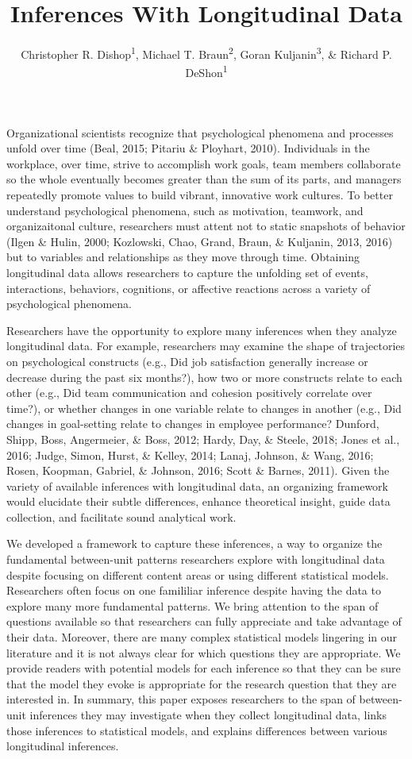 \documentclass[english,,man]{apa6}
\title{Inferences With Longitudinal Data}
\author{Christopher R. Dishop\textsuperscript{1}, Michael T.
Braun\textsuperscript{2}, Goran Kuljanin\textsuperscript{3}, \& Richard
P. DeShon\textsuperscript{1}}
\date{}
\affiliation{
\vspace{0.5cm}
\textsuperscript{1} Michigan State University\\\textsuperscript{2} University of South Florida\\\textsuperscript{3} DePaul University}
\theoremstyle{definition}
\theoremstyle{definition}
\theoremstyle{definition}
\theoremstyle{remark}
\begin{document}
\maketitle

Organizational scientists recognize that psychological phenomena and
processes unfold over time (Beal, 2015; Pitariu \& Ployhart, 2010).
Individuals in the workplace, over time, strive to accomplish work
goals, team members collaborate so the whole eventually becomes greater
than the sum of its parts, and managers repeatedly promote values to
build vibrant, innovative work cultures. To better understand
psychological phenomena, such as motivation, teamwork, and
organizaitonal culture, researchers must attent not to static snapshots
of behavior (Ilgen \& Hulin, 2000; Kozlowski, Chao, Grand, Braun, \&
Kuljanin, 2013, 2016) but to variables and relationships as they move
through time. Obtaining longitudinal data allows researchers to capture
the unfolding set of events, interactions, behaviors, cognitions, or
affective reactions across a variety of psychological phenomena.

Researchers have the opportunity to explore many inferences when they
analyze longitudinal data. For example, researchers may examine the
shape of trajectories on psychological constructs (e.g., Did job
satisfaction generally increase or decrease during the past six
months?), how two or more constructs relate to each other (e.g., Did
team communication and cohesion positively correlate over time?), or
whether changes in one variable relate to changes in another (e.g., Did
changes in goal-setting relate to changes in employee performance?
Dunford, Shipp, Boss, Angermeier, \& Boss, 2012; Hardy, Day, \& Steele,
2018; Jones et al., 2016; Judge, Simon, Hurst, \& Kelley, 2014; Lanaj,
Johnson, \& Wang, 2016; Rosen, Koopman, Gabriel, \& Johnson, 2016; Scott
\& Barnes, 2011). Given the variety of available inferences with
longitudinal data, an organizing framework would elucidate their subtle
differences, enhance theoretical insight, guide data collection, and
facilitate sound analytical work.

We developed a framework to capture these inferences, a way to organize
the fundamental between-unit patterns researchers explore with
longitudinal data despite focusing on different content areas or using
different statistical models. Researchers often focus on one famililiar
inference despite having the data to explore many more fundamental
patterns. We bring attention to the span of questions available so that
researchers can fully appreciate and take advantage of their data.
Moreover, there are many complex statistical models lingering in our
literature and it is not always clear for which questions they are
appropriate. We provide readers with potential models for each inference
so that they can be sure that the model they evoke is appropriate for
the research question that they are interested in. In summary, this
paper exposes researchers to the span of between-unit inferences they
may investigate when they collect longitudinal data, links those
inferences to statistical models, and explains differences between
various longitudinal inferences.
\end{document}
